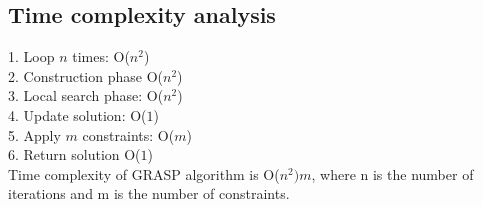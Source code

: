 \documentclass[12pt]{article}
\begin{document}
\subsection{Time complexity analysis}

1. Loop $n$ times: O($n^2$)\\
2. Construction phase O($n^2$)\\
3. Local search phase: O($n^2$)\\
4. Update solution: O($1$)\\
5. Apply $m$ constraints: O($m$)\\
6. Return solution O($1$)\\

Time complexity of GRASP algorithm is O($n^2)m$, where n is the number of iterations and m is the number of constraints.
\end{document}
